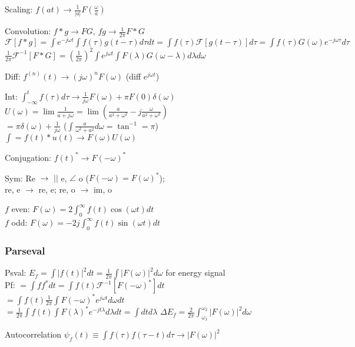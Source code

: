\documentclass[4pt]{article}
\theoremstyle{definition}
\theoremstyle{definition}
\renewcommand{\o}{\omega}
\newcommand{\ra}{\rightarrow}
\begin{document}
    Scaling: \(f(at)\ra \frac{1}{|a|}F(\frac{\o}{a})\)   %

    Convolution: \(f*g \ra FG\), \(fg \ra \frac{1}{2\pi} F*G\)\\
    \(\mathcal F[f*g] = \int e^{-j\o t} \int f(\tau) g(t-\tau)d\tau dt =\int f(\tau) \mathcal F[g(t-\tau)]  d\tau = \int f(\tau) G(\o)e^{-j\o\tau}d\tau\)\\
    \( \frac{1}{2\pi} \mathcal{F}^{-1}[F * G] = (\frac{1}{2\pi})^2 \int e^{j\o t} \int F(\lambda) G(\o - \lambda) d\lambda d\o\)

    Diff: \(f^{(n)}(t) \ra (j\o)^nF(\o)\) (diff $e^{j\o t}$)    %
    
    Int: \(\int_{-\infty}^t f(\tau)d\tau \ra \frac{1}{j\o}F(\o) + \pi F(0) \delta(\o)\)\\
    \(U(\o) = \lim \frac{1}{a+j\o} = \lim (\frac{a}{a^2+\o^2} - j\frac{\o}{a^2+\o^2}) \) \\
    \(= \pi\delta(\o) + \frac{1}{j\o}\) ($\int \frac{a}{\o^2+a^2}d\o = \tan^{-1}=\pi$)\\
    $\int = f(t) * u(t) \ra F(\o)U(\o)$

    Conjugation: \(f(t)^* \ra F(-\o)^*\)   %

    Sym: Re $\ra$ $||$ e, $\angle$ o ($F(-\o) = F(\o)^*$);\\
    re, e $\ra$ re, e; re, o $\ra$ im, o

    $f$ even: \(F(\o) = 2\int_0^{\infty} f(t)\cos(\o t) dt\)\\
    $f$ odd: \(F(\o) = -2j\int_0^{\infty} f(t) \sin(\o t) dt\)

\subsubsection{Parseval}
    Psval: \(E_f = \int |f(t)|^2 dt = \frac{1}{2\pi} \int |F(\omega)|^2 d\o\)  for energy signal\\  %
    Pf: \(= \int f f^* dt = \int f(t)\mathcal F ^{-1}[F(-\o)^*]dt\)\\
    \(= \int f(t) \frac{1}{2\pi} \int F(-\o)^* e^{j\o t} d\o dt\)\\
    \(= \frac{1}{2\pi}\int f(t) \int F(\lambda)^* e^{-jt\lambda} d\lambda dt = \int dt d\lambda\)
    \(\Delta E_f = \frac{2}{2\pi}\int^{\o_2}_{\o_1} |F(\o)|^2 d\o\) %

    Autocorrelation \(\psi_f(t) \equiv \int f(\tau)f(\tau-t)d\tau \ra |F(\o)|^2\)   %
\end{document}

